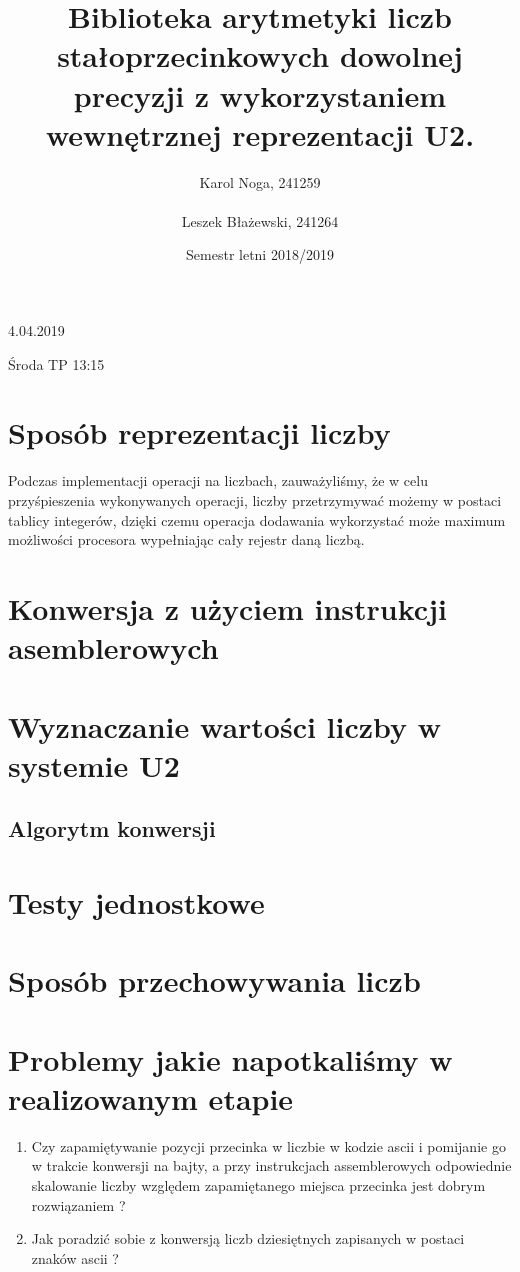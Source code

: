 \documentclass[a4paper]{article}
\title{Biblioteka arytmetyki liczb stałoprzecinkowych dowolnej precyzji z wykorzystaniem wewnętrznej reprezentacji U2.}
\author{Karol Noga, 241259 \\ \\Leszek Błażewski, 241264}
\date{Semestr letni 2018/2019}
\begin{document}
\maketitle
\vspace{1mm}
{\centering \Large{4.04.2019}\par}
\vspace{1mm}
{\centering \Large{Środa TP 13:15}\par}
\clearpage
\section{Sposób reprezentacji liczby}

Podczas implementacji operacji na liczbach, zauważyliśmy, że w celu przyśpieszenia wykonywanych operacji, liczby przetrzymywać możemy w postaci tablicy integerów, dzięki czemu operacja dodawania wykorzystać może maximum możliwości procesora wypełniając cały rejestr daną liczbą.


\section{Konwersja z użyciem instrukcji asemblerowych}
 
\section{Wyznaczanie wartości liczby w systemie U2}

\subsection{Algorytm konwersji}

\section{Testy jednostkowe}


\section{Sposób przechowywania liczb}


\section{Problemy jakie napotkaliśmy w realizowanym etapie}
\begin{enumerate}
    \item Czy zapamiętywanie pozycji przecinka w liczbie w kodzie ascii i pomijanie go w trakcie konwersji na bajty, a przy instrukcjach assemblerowych odpowiednie skalowanie liczby względem zapamiętanego miejsca przecinka jest dobrym rozwiązaniem ?
    \item Jak poradzić sobie z konwersją liczb dziesiętnych zapisanych w postaci znaków ascii ? 
\end{enumerate}
\end{document}
